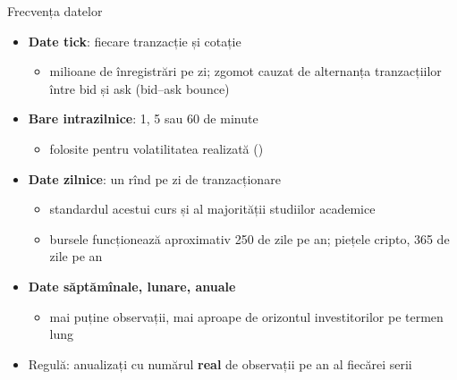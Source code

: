 \begin{frame}{Frecvența datelor}
\itemsize{\small}
\begin{itemize}
    \item \textbf{Date tick}: fiecare tranzacție și cotație
    \begin{itemize}
        \item milioane de înregistrări pe zi; zgomot cauzat de alternanța tranzacțiilor între bid și ask (bid--ask bounce)
    \end{itemize}
    \item \textbf{Bare intrazilnice}: 1, 5 sau 60 de minute
    \begin{itemize}
        \item folosite pentru volatilitatea realizată ()
    \end{itemize}
    \item \textbf{Date zilnice}: un rînd pe zi de tranzacționare
    \begin{itemize}
        \item standardul acestui curs și al majorității studiilor academice
        \item bursele funcționează aproximativ 250 de zile pe an; piețele cripto, 365 de zile pe an
    \end{itemize}
    \item \textbf{Date săptămînale, lunare, anuale}
    \begin{itemize}
        \item mai puține observații, mai aproape de orizontul investitorilor pe termen lung
    \end{itemize}
    \item Regulă: anualizați cu numărul \textbf{real} de observații pe an al fiecărei serii
\end{itemize}
\end{frame}

